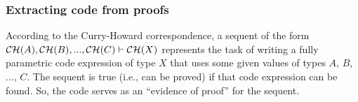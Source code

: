 \subsubsection*{Extracting code from proofs}

According to the Curry-Howard correspondence, a sequent of the form
 ${\cal CH}(A),{\cal CH}(B),...,{\cal CH}(C)\vdash{\cal CH}(X)$ represents
the task of writing a fully parametric code expression of type $X$
that uses some given values of types $A$, $B$, ..., $C$. The sequent
is true (i.e., can be proved) if that code expression can be found.
So, the code serves as an \textsf{``}evidence of proof\textsf{''} for the sequent.

\begin{figure}
\begin{centering}
{\small{}}%
\noindent{}
\end{centering}
\end{figure}
